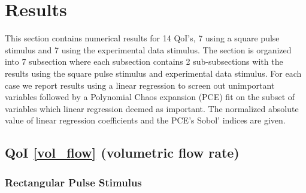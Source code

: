 \documentclass[12pt]{article}
\numberwithin{equation}{section}
\begin{document}
\section{Results}
This section contains numerical results for 14 QoI's, 7 using a square pulse stimulus and 7 using the experimental data stimulus. The section is organized into 7 subsection where each subsection contains 2 sub-subsections with the results using the square pulse stimulus and experimental data stimulus. For each case we report results using a linear regression to screen out unimportant variables followed by a Polynomial Chaos expansion (PCE) fit on the subset of variables which linear regression deemed as important. The normalized absolute value of linear regression coefficients and the PCE's Sobol' indices are given.

\newpage

\subsection{QoI \eqref{vol_flow} (volumetric flow rate)}

\subsubsection{Rectangular Pulse Stimulus}
\end{document}
